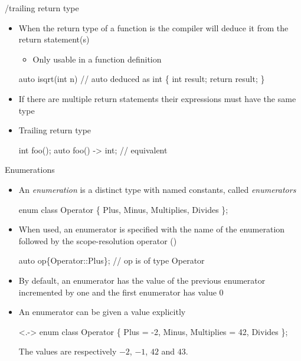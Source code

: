 \begin{frame}[fragile]{/trailing return type}

  \begin{itemize}
  \item When the return type of a function is  the compiler will
    deduce it from the return statement(s)
    \begin{itemize}
    \item Only usable in a function definition
    \end{itemize}

    \begin{codeblock}
auto isqrt(int n)    // auto deduced as int
\{
  int result;
  \ddd
  return result;
\}
\end{codeblock}

  \item<2-> If there are multiple return statements their expressions must have the
    same type
  \item<3-> Trailing return type
    \begin{codeblock}
int foo(\ddd);
auto foo(\ddd) -> int; // equivalent\end{codeblock}

  \end{itemize}

\end{frame}

\begin{frame}[fragile]{Enumerations}

  \begin{itemize}[<+->]
  \item An \textit{enumeration} is a distinct type with named constants, called
    \textit{enumerators}

  \begin{codeblock}
enum class Operator \{ Plus, Minus, Multiplies, Divides \};\end{codeblock}

  \item When used, an enumerator is specified with the name of the enumeration
    followed by the scope-resolution operator (\code{::})

    \begin{codeblock}
auto op\{Operator::Plus\}; // op is of type Operator\end{codeblock}

  \item By default, an enumerator has the value of the previous enumerator
    incremented by one and the first enumerator has value $0$
  \item An enumerator can be given a value explicitly
    \begin{codeblock}<.->{
enum class Operator \{ Plus = -2, Minus, Multiplies = 42, Divides \};}\end{codeblock}
    The values are respectively $-2$, $-1$, $42$ and $43$.

  \end{itemize}
\end{frame}

